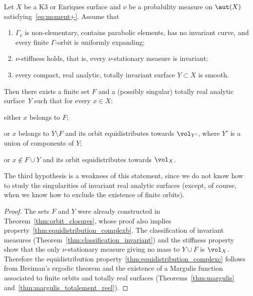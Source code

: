 \begin{thm}\label{thm:equidistribution_complex}
Let $X$ be a K3 or Enriques surface and $\nu$ be a probability
measure on $\aut(X)$ satisfying~\eqref{eq:moment+}.
Assume that
\begin{enumerate}
\item\label{thm:equidistribution_complex1} $\Gamma_\nu$ is non-elementary, contains parabolic elements, has no invariant curve,
and every finite $\Gamma$-orbit is uniformly expanding;
\item $\nu$-stiffness holds, that is, every $\nu$-stationary measure is invariant;
\item\label{thm:equidistribution_complex2} every compact, real analytic, totally invariant surface $Y\subset X$ is smooth.
\end{enumerate}
Then there exists a finite set $F$ and a (possibly singular) totally real analytic surface~$Y$ such that for every
$x\in X$:
\begin{enumeratea}
\item\label{thm:equidistribution_complexa} either $x$ belongs to $F$;
\item\label{thm:equidistribution_complexb} or $x$ belongs to $Y\setminus F$ and its orbit equidistributes towards $\vol_{Y'}$, where $Y'$ is a union of components of $Y$;
\item\label{thm:equidistribution_complexc} or $x\notin F\cup Y$ and its orbit equidistributes towards $\vol_{X}$.
\end{enumeratea}
\end{thm}

The third hypothesis is a weakness of this statement, since we do not know how to study the singularities of invariant real analytic surfaces (except, of course, when we know how to exclude the existence of finite orbits).

\begin{proof}
The sets $F$ and $Y$ were already constructed in Theorem~\ref{thm:orbit_closures}, whose proof
also implies property~\eqref{thm:equidistribution_complexb}.
The classification of invariant measures (Theorem~\ref{thm:classification_invariant}) and the
stiffness property show that the only $\nu$-stationary measure giving no mass to
$Y\cup F$ is $\vol_X$. Therefore the equidistribution property~\eqref{thm:equidistribution_complexc} follows from Breiman's ergodic theorem
and the existence of a Margulis function associated to finite orbits and totally real surfaces (Theorems~\ref{thm:margulis} and~\ref{thm:margulis_totalement_reel}).
\end{proof}

